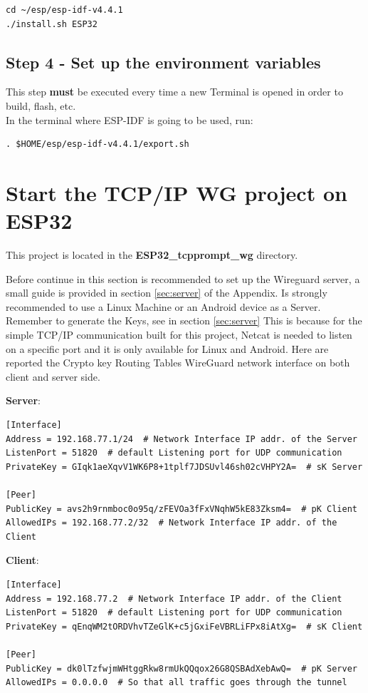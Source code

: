 \begin{lstlisting}
cd ~/esp/esp-idf-v4.4.1
./install.sh ESP32
\end{lstlisting}

\subsection{Step 4 - Set up the environment variables}\label{sec:envSetup}
This step \textbf{must} be executed every time a new Terminal is opened in order to build, flash, etc.
\\In the terminal where ESP-IDF is going to be used, run:

\begin{lstlisting}
. $HOME/esp/esp-idf-v4.4.1/export.sh
\end{lstlisting}

\section{Start the TCP/IP WG project on ESP32}\label{sec:WGprog}
This project is located in the \textbf{ESP32\_tcpprompt\_wg} directory.

Before continue in this section is recommended to set up the Wireguard server, a small guide is provided in section \ref{sec:server} of the Appendix. 
Is strongly recommended to use a Linux Machine or an Android device as a Server. 
Remember to generate the Keys, see in section \ref{sec:server}
This is because for the simple TCP/IP communication built for this project, Netcat is needed to listen on a specific port and it is only available for Linux and Android.
Here are reported the Crypto key Routing Tables WireGuard network interface on both client and server side.

\textbf{Server}:
\begin{lstlisting}
[Interface]
Address = 192.168.77.1/24  # Network Interface IP addr. of the Server
ListenPort = 51820  # default Listening port for UDP communication
PrivateKey = GIqk1aeXqvV1WK6P8+1tplf7JDSUvl46sh02cVHPY2A=  # sK Server 

[Peer]
PublicKey = avs2h9rnmboc0o95q/zFEVOa3fFxVNqhW5kE83Zksm4=  # pK Client
AllowedIPs = 192.168.77.2/32  # Network Interface IP addr. of the Client
\end{lstlisting}

\textbf{Client}:
\begin{lstlisting}
[Interface]
Address = 192.168.77.2  # Network Interface IP addr. of the Client
ListenPort = 51820  # default Listening port for UDP communication
PrivateKey = qEnqWM2tORDVhvTZeGlK+c5jGxiFeVBRLiFPx8iAtXg=  # sK Client 

[Peer]
PublicKey = dk0lTzfwjmWHtggRkw8rmUkQQqox26G8QSBAdXebAwQ=  # pK Server
AllowedIPs = 0.0.0.0  # So that all traffic goes through the tunnel
\end{lstlisting}

